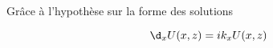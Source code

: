 % 
% 
% 








Grâce à l'hypothèse sur la forme des solutions

\[
  \d_{\x} U(\x,\z) = ik_\x U(\x,\z)
\]

